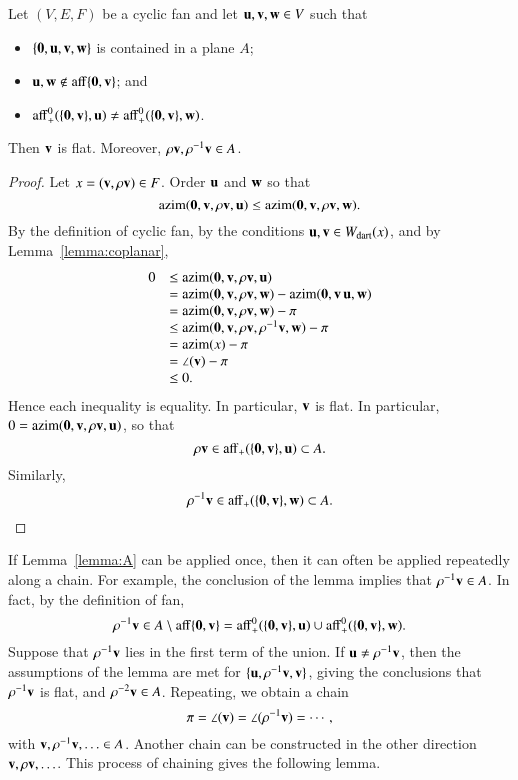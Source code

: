 \begin{lemma} \label{lemma:A}  Let $(V,E,F)$ be a cyclic fan and let
$\u,\v,\w\in V$ such that
\begin{itemize}
\item $\{\orz,\u,\v,\w\}$ is contained in a plane $A$; \vspace{3pt}
\item $\u,\w\not\in\op{aff}\{\orz,\v\}$; and \vspace{3pt}
\item $\op{aff}^0_+(\{\orz,\v\},\u) \ne \op{aff}^0_+(\{\orz,\v\},\w)$.
\end{itemize}
Then $\v$ is flat.  Moreover, $\rho \v,\rho^{-1} \v\in A$.
\end{lemma}

\begin{proof} Let $x = (\v,\rho\v)\in F$.  
Order $\u$ and $\w$ so that
$$
\op{azim}(\orz,\v,\rho\v,\u) \le \op{azim}(\orz,\v,\rho\v,\w).
$$
By the definition of cyclic fan, by the conditions $\u,\v\in \bWdart(x)$, 
and by  Lemma~\ref{lemma:coplanar},
$$
\begin{array}{rll}
0 &\le \op{azim}(\orz,\v,\rho\v,\u) \\
   &= \op{azim}(\orz,\v,\rho\v,\w) - \op{azim}(\orz,\v\,\u,\w)\\
    &= \op{azim}(\orz,\v,\rho\v,\w)-\pi \\
   &\le \op{azim}(\orz,\v,\rho\v,\rho^{-1}\v,\w) - \pi \\
   &=\op{azim}(x) - \pi \\
   &=\angle(\v)-\pi\\
   &\le 0. 
\end{array}
$$
Hence each inequality is equality.  In particular, $\v$ is flat.
In particular, $0 =\op{azim}(\orz,\v,\rho\v,\u)$, so that 
$$\rho\v\in \op{aff}_+(\{\orz,\v\},\u) \subset A.$$
Similarly,
$$
\rho^{-1}\v\in \op{aff}_+(\{\orz,\v\},\w) \subset A.
$$
\end{proof}

If Lemma~\ref{lemma:A} can be applied once, then it can often be applied repeatedly along a chain.  For example, the conclusion of the lemma implies
that $\rho^{-1} \v \in A$.  In fact, by the definition of fan, 
$$\rho^{-1}\v \in A \setminus \op{aff}\{\orz,\v\} = \op{aff}^0_+(\{\orz,\v\},\u) \cup \op{aff}^0_+(\{\orz,\v\},\w).$$
Suppose that $\rho^{-1} \v$ lies in the first term of the union.  If $\u\ne \rho^{-1}\v$, then the assumptions of the lemma
are met for $\{\u,\rho^{-1} \v,\v\}$, giving the conclusions that $\rho^{-1} \v$ is flat, and $\rho^{-2}\v\in A$.  Repeating, we obtain a chain
$$
\pi=\angle(\v) = \angle(\rho^{-1} \v) = \cdots,
$$
with $\v,\rho^{-1}\v,\ldots\in A$.  Another chain can be constructed in the other direction $\v,\rho \v,\ldots$.
This process of chaining gives the following lemma.

